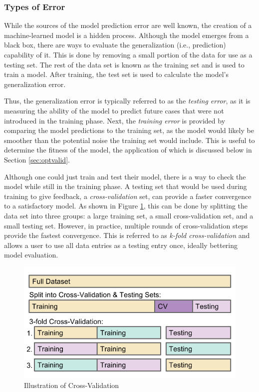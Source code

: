 \subsubsection{Types of Error}

While the sources of the model prediction error are well known, the creation of
a machine-learned model is a hidden process. Although the model emerges
from a black box, there are ways to evaluate the generalization (i.e.,
prediction) capability of it.  This is done by removing a small portion of the
data for use as a testing set.  The rest of the data set is known as the
training set and is used to train a model. After training, the test set is used
to calculate the model's generalization error.  

Thus, the generalization error is typically referred to as the \textit{testing
error}, as it is measuring the ability of the model to predict future cases
that were not introduced in the training phase.
Next, the \textit{training error} is provided by comparing the model
predictions to the training set, as the model would likely be smoother than the
potential noise the training set would include. This is useful to determine the
fitness of the model, the application of which is discussed below in Section
\ref{sec:optvalid}.

Although one could just train and test their model, there is a way to check the
model while still in the training phase. A testing set that would be used
during training to give feedback, a \textit{cross-validation} set, can provide
a faster convergence to a satisfactory model. As shown in Figure
\ref{fig:cverror}, this can be done by splitting the data set into three
groups: a large training set, a small cross-validation set, and a small testing
set.  However, in practice, multiple rounds of cross-validation steps provide
the fastest convergence.  This is referred to as
\textit{k-fold cross-validation} and allows a user to use all data entries as a
testing entry once, ideally bettering model evaluation. 

\begin{figure}[!htb]
  \centering
  \includegraphics[width=0.85\linewidth]{./chapters/litrev/cverror.png}
  \caption{Illustration of Cross-Validation}
  \label{fig:cverror}
\end{figure}

